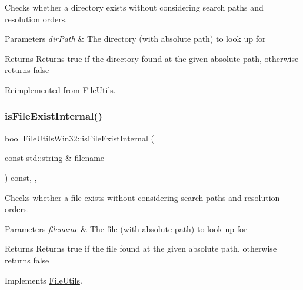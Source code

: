 Checks whether a directory exists without considering search paths and resolution orders. 
\begin{DoxyParams}{Parameters}
{\em dir\+Path} & The directory (with absolute path) to look up for \\
\hline
\end{DoxyParams}
\begin{DoxyReturn}{Returns}
Returns true if the directory found at the given absolute path, otherwise returns false 
\end{DoxyReturn}


Reimplemented from \hyperlink{classFileUtils_a6f2a350e8f2b15219637b40bed4c38ec}{File\+Utils}.

\mbox{\label{classFileUtilsWin32_ab3538e3fa4418afbff4e95858a553ff7}} 
\subsubsection{\texorpdfstring{is\+File\+Exist\+Internal()}{isFileExistInternal()}\hspace{0.1cm}{\footnotesize\ttfamily [1/2]}}
{\footnotesize\ttfamily bool File\+Utils\+Win32\+::is\+File\+Exist\+Internal (\begin{DoxyParamCaption}\item[{const std\+::string \&}]{filename }\end{DoxyParamCaption}) const\hspace{0.3cm}{\ttfamily [override]}, {\ttfamily [protected]}, {\ttfamily [virtual]}}

Checks whether a file exists without considering search paths and resolution orders. 
\begin{DoxyParams}{Parameters}
{\em filename} & The file (with absolute path) to look up for \\
\hline
\end{DoxyParams}
\begin{DoxyReturn}{Returns}
Returns true if the file found at the given absolute path, otherwise returns false 
\end{DoxyReturn}


Implements \hyperlink{classFileUtils_a0e1dc78cbe5ac5689e1f67ebd4413bab}{File\+Utils}.

\mbox{\label{classFileUtilsWin32_aacf984dcf838fc8d3303e47eb33a8601}} 
